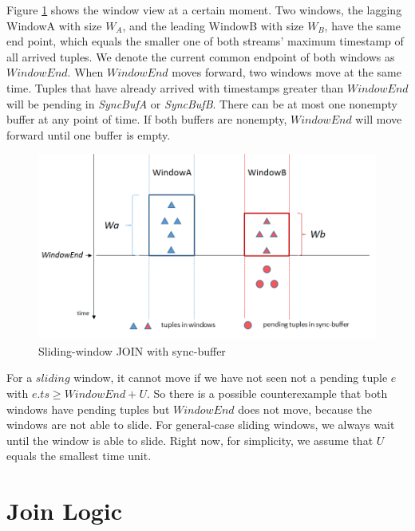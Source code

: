 \documentclass[a4paper, 11pt, twoside]{report}
\begin{document}
Figure \ref{fig:system_arch_windows} shows the window view at a certain moment. Two windows, the lagging WindowA with size $W_A$, and the leading WindowB with size $W_B$, have the same end point, which equals the smaller one of both streams' maximum timestamp of all arrived tuples. We denote the current common endpoint of both windows as $WindowEnd$. When $WindowEnd$ moves forward, two windows move at the same time. Tuples that have already arrived with timestamps greater than $WindowEnd$ will be pending in \textit{SyncBufA} or \textit{SyncBufB}. There can be at most one nonempty buffer at any point of time. If both buffers are nonempty, $WindowEnd$ will move forward until one buffer is empty.\\

%

\begin{figure}[h]
\centering
\includegraphics[scale=0.55]{system_arch_windows}
\caption{Sliding-window JOIN with sync-buffer\label{fig:system_arch_windows}}
\end{figure}

For a $sliding$ window, it cannot move if we have not seen not a pending tuple $e$ with $e.ts\geq WindowEnd+U$. So there is a possible counterexample that both windows have pending tuples but $WindowEnd$ does not move, because the windows are not able to slide. For general-case sliding windows, we always wait until the window is able to slide. Right now, for simplicity, we assume that $U$ equals the smallest time unit.\\


\section{Join Logic}
\end{document}
